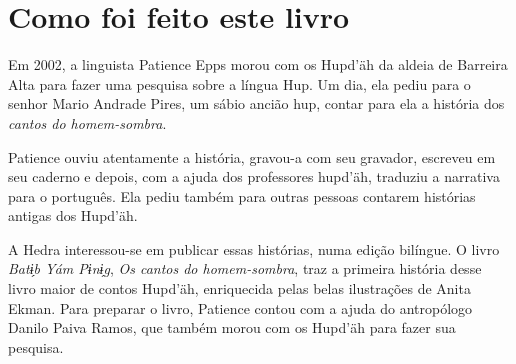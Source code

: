 \chapter{Como foi feito este livro}

Em 2002, a linguista Patience Epps morou com os Hupd’äh da aldeia de Barreira Alta para fazer uma pesquisa sobre a língua Hup. Um dia, ela pediu para o senhor Mario Andrade Pires, um sábio ancião hup, contar para ela a história dos \textit{cantos do homem-sombra}.

Patience ouviu atentamente a história, gravou-a com seu gravador, escreveu em seu caderno e depois, com a ajuda dos professores hupd’äh, traduziu a narrativa para o português. Ela pediu também para outras pessoas contarem histórias antigas dos Hupd’äh.


A Hedra interessou-se em publicar essas histórias, numa edição bilíngue. O livro \textit{Batɨ̗b  Yám Pɨnɨ̗g}, \textit{Os cantos do homem-sombra}, traz a primeira história desse livro maior de contos Hupd’äh, enriquecida pelas belas ilustrações de Anita Ekman. Para preparar o livro, Patience contou com a ajuda do antropólogo Danilo Paiva Ramos, que também morou com os Hupd’äh para fazer sua pesquisa.



